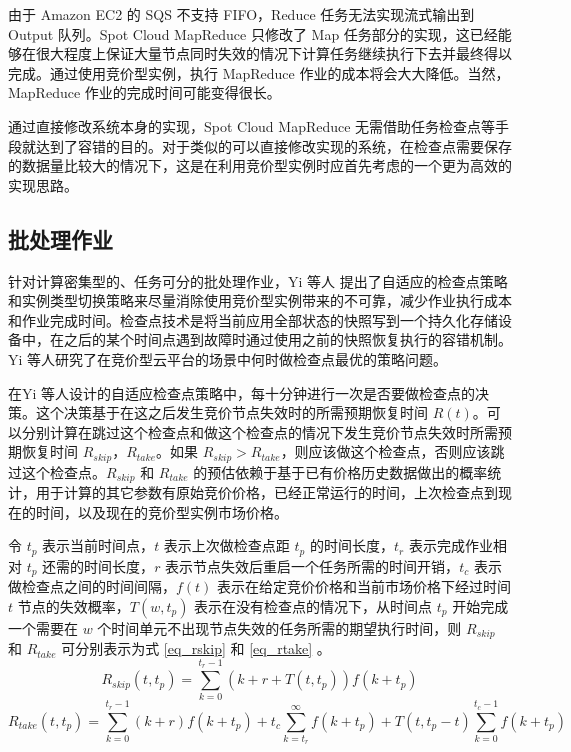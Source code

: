 由于 Amazon EC2 的 SQS 不支持 FIFO，Reduce 任务无法实现流式输出到 Output 队列。Spot Cloud MapReduce 只修改了 Map 任务部分的实现，这已经能够在很大程度上保证大量节点同时失效的情况下计算任务继续执行下去并最终得以完成。通过使用竞价型实例，执行 MapReduce 作业的成本将会大大降低。当然，MapReduce 作业的完成时间可能变得很长。

通过直接修改系统本身的实现，Spot Cloud MapReduce 无需借助任务检查点等手段就达到了容错的目的。对于类似的可以直接修改实现的系统，在检查点需要保存的数据量比较大的情况下，这是在利用竞价型实例时应首先考虑的一个更为高效的实现思路。

\subsection{批处理作业}
针对计算密集型的、任务可分的批处理作业，Yi 等人 \cite{Yi:2010:RCS:1844768.1845343, 5975137} 提出了自适应的检查点策略和实例类型切换策略来尽量消除使用竞价型实例带来的不可靠，减少作业执行成本和作业完成时间。检查点技术是将当前应用全部状态的快照写到一个持久化存储设备中，在之后的某个时间点遇到故障时通过使用之前的快照恢复执行的容错机制。Yi 等人研究了在竞价型云平台的场景中何时做检查点最优的策略问题。

在Yi 等人设计的自适应检查点策略中，每十分钟进行一次是否要做检查点的决策。这个决策基于在这之后发生竞价节点失效时的所需预期恢复时间 $R(t)$。可以分别计算在跳过这个检查点和做这个检查点的情况下发生竞价节点失效时所需预期恢复时间 $R_{skip}$，$R_{take}$。如果 $R_{skip} > R_{take}$，则应该做这个检查点，否则应该跳过这个检查点。$R_{skip}$ 和 $R_{take}$ 的预估依赖于基于已有价格历史数据做出的概率统计，用于计算的其它参数有原始竞价价格，已经正常运行的时间，上次检查点到现在的时间，以及现在的竞价型实例市场价格。

令 $t_p$ 表示当前时间点，$t$ 表示上次做检查点距 $t_p$ 的时间长度，$t_r$ 表示完成作业相对 $t_p$ 还需的时间长度，$r$ 表示节点失效后重启一个任务所需的时间开销，$t_c$ 表示做检查点之间的时间间隔，$f(t)$ 表示在给定竞价价格和当前市场价格下经过时间 $t$ 节点的失效概率，$T(w, t_p)$ 表示在没有检查点的情况下，从时间点 $t_p$ 开始完成一个需要在 $w$ 个时间单元不出现节点失效的任务所需的期望执行时间，则 $R_{skip}$ 和 $R_{take}$ 可分别表示为式 \eqref{eq_rskip} 和 \eqref{eq_rtake} 。
\begin{equation}\label{eq_rskip} 
R_{skip}(t, t_p) = \sum_{k=0}^{t_r - 1}(k + r + T(t,t_p))f(k+t_p)
\end{equation}
\begin{equation}\label{eq_rtake} 
R_{take}(t, t_p) = \sum_{k=0}^{t_r - 1}(k + r)f(k+t_p) + t_c\sum_{k=t_r}^{\infty}f(k+t_p)+T(t,t_p-t)\sum_{k=0}^{t_c - 1}f(k+t_p)
\end{equation}

